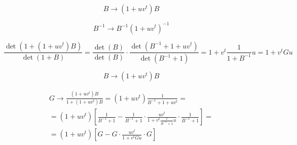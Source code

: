 \documentclass[onecolumn,english,prl,showpacs]{revtex4}
\begin{document}
\begin{equation}
 B \rightarrow (1+uv^t)B
\end{equation}

\begin{equation}
 B^{-1} \rightarrow B^{-1}(1+uv^t)^{-1}
\end{equation}

\begin{equation}
 \frac{\det(1+(1+uv^t)B)}{\det(1+B)} = \frac{\det(B)}{\det(B)}\cdot \frac{\det(B^{-1}+1+uv^t)}{\det(B^{-1}+1)} = 1+v^t\frac{1}{1+B^{-1}} u = 1+v^t G u
\end{equation}

\begin{equation}
 B \rightarrow (1+uv^t)B
\end{equation}

\begin{multline}
 G \rightarrow \frac{(1+uv^t)B}{1+(1+uv^t)B} = (1+uv^t)\frac{1}{B^{-1}+1+uv^t} =\\= (1+uv^t)\left[\frac{1}{B^{-1}+1}-\frac{1}{B^{-1}+1}\cdot\frac{uv^t}{1+v^t\frac{1}{B^{-1}+1}u}\cdot\frac{1}{B^{-1}+1}\right]=\\= (1+uv^t)\left[G-G\cdot\frac{uv^t}{1+v^tGu}\cdot G\right]
\end{multline}
\end{document}
